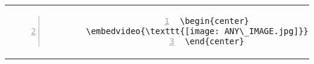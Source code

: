 \begin{table}[h!]
\begin{tabular}{c | c}
\begin{minipage}[m]{0.55\textwidth}
\begin{lstlisting}[numberstyle=\zebra{orange!15}{red!15},numbers=left,basicstyle=\tiny]
\begin{center}
        \embedvideo{\texttt{[image: ANY\_IMAGE.jpg]}}{ANY_VIDEO.mp4}
\end{center}

\end{lstlisting}
\end{minipage}
\end{tabular}
\end{table}
 